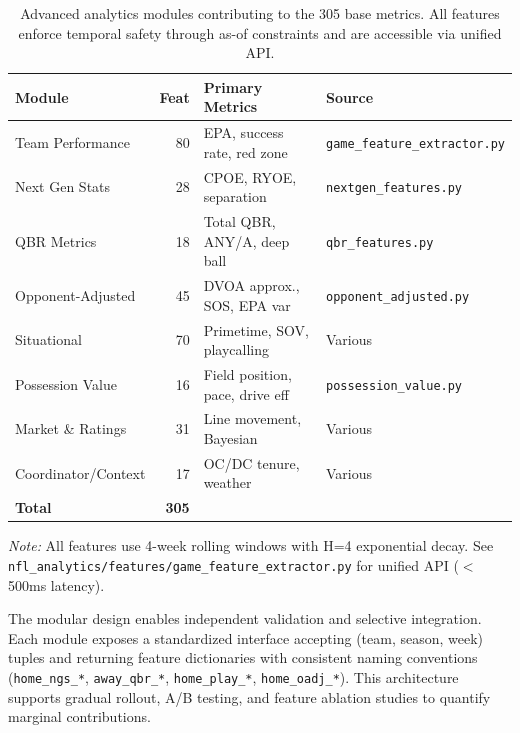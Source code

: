 \begin{table}[t]
  \centering
  \footnotesize
  \caption[Advanced analytics modules (305 base metrics)]{Advanced analytics modules contributing to the 305 base metrics. All features enforce temporal safety through as-of constraints and are accessible via unified API.}
  \label{tab:phase2-feature-inventory}
  \setlength{\tabcolsep}{3pt}
  \begin{tabular}{@{} l r p{4.2cm} l @{}}
    \toprule
    \textbf{Module} & \textbf{Feat} & \textbf{Primary Metrics} & \textbf{Source} \\
    \midrule
    Team Performance & 80 & EPA, success rate, red zone & \texttt{game\_feature\_extractor.py} \\
    Next Gen Stats & 28 & CPOE, RYOE, separation & \texttt{nextgen\_features.py} \\
    QBR Metrics & 18 & Total QBR, ANY/A, deep ball & \texttt{qbr\_features.py} \\
    Opponent-Adjusted & 45 & DVOA approx., SOS, EPA var & \texttt{opponent\_adjusted.py} \\
    Situational & 70 & Primetime, SOV, playcalling & Various \\
    Possession Value & 16 & Field position, pace, drive eff & \texttt{possession\_value.py} \\
    Market \& Ratings & 31 & Line movement, Bayesian & Various \\
    Coordinator/Context & 17 & OC/DC tenure, weather & Various \\
    \midrule
    \textbf{Total} & \textbf{305} & & \\
    \bottomrule
  \end{tabular}

  \vspace{1mm}
  \footnotesize\textit{Note:} All features use 4-week rolling windows with H=4 exponential decay. See \texttt{nfl\_analytics/features/\allowbreak game\_feature\_extractor.py} for unified API ($<$500ms latency).
\end{table}

The modular design enables independent validation and selective integration. Each module exposes a standardized interface accepting (team, season, week) tuples and returning feature dictionaries with consistent naming conventions (\texttt{home\_ngs\_*}, \texttt{away\_qbr\_*}, \texttt{home\_play\_*}, \texttt{home\_oadj\_*}). This architecture supports gradual rollout, A/B testing, and feature ablation studies to quantify marginal contributions.

